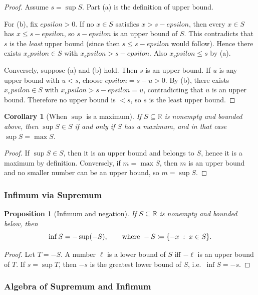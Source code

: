 \documentclass[12pt]{article}
\numberwithin{equation}{section}
\def\eps{epsilon}
\newcommand{\RR}{\mathbb{R}}
\DeclarePairedDelimiter{\set}{\{}{\}}
\newcommand{\eps}{\varepsilon}               %
\newcommand{\st}{\;:\;}                      %
\theoremstyle{plain}
\newtheorem{proposition}[theorem]{Proposition}
\newtheorem{corollary}[theorem]{Corollary}
\theoremstyle{definition}
\theoremstyle{remark}
\begin{document}
\begin{proof}
Assume $s=\sup S$. Part (a) is the definition of upper bound.

For (b), fix $\eps>0$. If no $x\in S$ satisfies $x> s-\eps$, then every $x\in S$ has $x\le s-\eps$, so $s-\eps$ is an upper bound of $S$. This contradicts that $s$ is the \emph{least} upper bound (since then $s\le s-\eps$ would follow). Hence there exists $x_\eps\in S$ with $x_\eps>s-\eps$. Also $x_\eps\le s$ by (a).

Conversely, suppose (a) and (b) hold. Then $s$ is an upper bound. If $u$ is any upper bound with $u<s$, choose $\eps=s-u>0$. By (b), there exists $x_\eps\in S$ with $x_\eps>s-\eps=u$, contradicting that $u$ is an upper bound. Therefore no upper bound is $<s$, so $s$ is the least upper bound.
\end{proof}

\begin{corollary}[When $\sup$ is a maximum]\label{cor:sup-max}
If $S\subseteq\RR$ is nonempty and bounded above, then $\sup S\in S$ if and only if $S$ has a maximum, and in that case $\sup S=\max S$.
\end{corollary}

\begin{proof}
If $\sup S\in S$, then it is an upper bound and belongs to $S$, hence it is a maximum by definition.
Conversely, if $m=\max S$, then $m$ is an upper bound and no smaller number can be an upper bound, so $m=\sup S$.
\end{proof}

\subsubsection{Infimum via Supremum}

\begin{proposition}[Infimum and negation]\label{prop:inf-sup}
If $S\subseteq\RR$ is nonempty and bounded below, then
\[
\inf S = - \sup(-S),
\qquad\text{where } -S\coloneqq \set*{-x \st x\in S}.
\]
\end{proposition}

\begin{proof}
Let $T=-S$. A number $\ell$ is a lower bound of $S$ iff $-\ell$ is an upper bound of $T$.
If $s=\sup T$, then $-s$ is the greatest lower bound of $S$, i.e.\ $\inf S=-s$.
\end{proof}

\subsubsection{Algebra of Supremum and Infimum}
\end{document}
